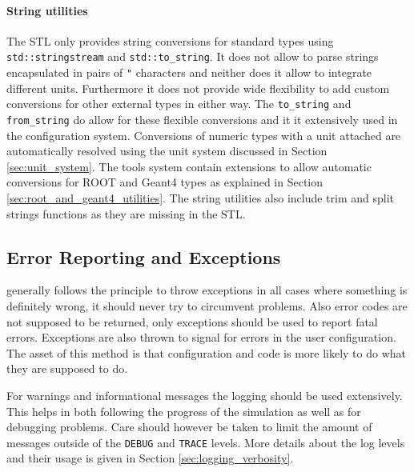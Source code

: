 \paragraph{String utilities}
\label{sec:string_utilities}
The STL only provides string conversions for standard types using \texttt{std::stringstream} and \texttt{std::to\_string}. It does not allow to parse strings encapsulated in pairs of \texttt{"} characters and neither does it allow to integrate different units. Furthermore it does not provide wide flexibility to add custom conversions for other external types in either way. The \apsq \texttt{to\_string} and \texttt{from\_string} do allow for these flexible conversions and it it extensively used in the configuration system. Conversions of numeric types with a unit attached are automatically resolved using the unit system discussed in Section \ref{sec:unit_system}. The \apsq tools system contain extensions to allow automatic conversions for ROOT and Geant4 types as explained in Section \ref{sec:root_and_geant4_utilities}. The string utilities also include trim and split strings functions as they are missing in the STL.

\subsection{Error Reporting and Exceptions}
\label{sec:error_reporting_exceptions}
\apsq generally follows the principle to throw exceptions in all cases where something is definitely wrong, it should never try to circumvent problems. Also error codes are not supposed to be returned, only exceptions should be used to report fatal errors. Exceptions are also thrown to signal for errors in the user configuration. The asset of this method is that configuration and code is more likely to do what they are supposed to do.

For warnings and informational messages the logging should be used extensively. This helps in both following the progress of the simulation as well as for debugging problems. Care should however be taken to limit the amount of messages outside of the \texttt{DEBUG} and \texttt{TRACE} levels. More details about the log levels and their usage is given in Section \ref{sec:logging_verbosity}.

